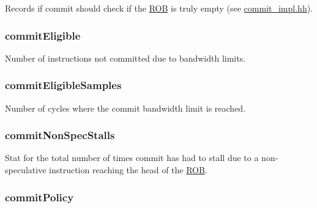 \label{classDefaultCommit_aa2d2d9b2eec88d804e25d1cb37aa6083}
Records if commit should check if the \hyperlink{classROB}{ROB} is truly empty (see \hyperlink{commit__impl_8hh}{commit\_\-impl.hh}). \hypertarget{classDefaultCommit_a26f5138543e43cbaba9459036fc0b04c}{
\subsubsection[{commitEligible}]{ {\bf commitEligible}}}
\label{classDefaultCommit_a26f5138543e43cbaba9459036fc0b04c}
Number of instructions not committed due to bandwidth limits. \hypertarget{classDefaultCommit_a16d1a4bbb2cb87488fd876fbf6e7a518}{
\subsubsection[{commitEligibleSamples}]{ {\bf commitEligibleSamples}}}
\label{classDefaultCommit_a16d1a4bbb2cb87488fd876fbf6e7a518}
Number of cycles where the commit bandwidth limit is reached. \hypertarget{classDefaultCommit_ab930685f4a43596f8a315d7dc9f5c2e4}{
\subsubsection[{commitNonSpecStalls}]{ {\bf commitNonSpecStalls}}}
\label{classDefaultCommit_ab930685f4a43596f8a315d7dc9f5c2e4}
Stat for the total number of times commit has had to stall due to a non-\/ speculative instruction reaching the head of the \hyperlink{classROB}{ROB}. \hypertarget{classDefaultCommit_acbc18713699043ca78415e9f03712ce1}{
\subsubsection[{commitPolicy}]{ {\bf commitPolicy}}}
